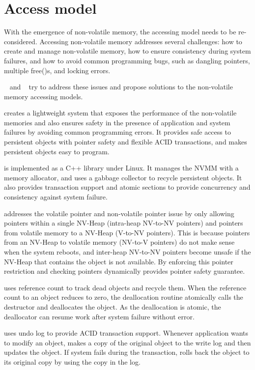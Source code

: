 \section{Access model} 
\label{sec:access}

With the emergence of non-volatile memory, the accessing model needs
to be re-considered. Accessing non-volatile memory addresses several
challenges: how to create and manage non-volatile memory, how to ensure
consistency during system failures, and how to avoid common programming
bugs, such as dangling pointers, multiple free()s, and locking errors.

\nvh{}~\cite{nvheaps} and \mnem{}~\cite{mnemosyne} try to address these issues
and propose solutions to the non-volatile memory accessing models.

\nvh{} creates a lightweight system that exposes the performance of the
non-volatile memories and also ensures safety in the presence of
application and system failures by avoiding common programming errors.
It provides safe access to persistent objects with pointer safety and
flexible ACID transactions, and makes persistent objects easy to program.

\nvh{} is implemented as a C++ library under Linux. It manages
the NVMM with a memory allocator, and uses a gabbage collector to recycle
persistent objects. It also provides transaction support and atomic sections 
to provide concurrency and consistency against system failure.

\nvh{} addresses the volatile pointer and non-volatile pointer issue by
only allowing pointers within a single NV-Heap (intra-heap NV-to-NV pointers)
and pointers from volatile memory to a NV-Heap (V-to-NV pointers). This is
because pointers from an NV-Heap to volatile memory (NV-to-V pointers) do
not make sense when the system reboots, and inter-heap NV-to-NV pointers become
unsafe if the NV-Heap that contains the object is not available. By enforcing
this pointer restriction and checking pointers dynamically \nvh{} provides
pointer safety guarantee.

\nvh{} uses reference count to track dead objects and recycle them. When 
the reference count to an object reduces to zero, the deallocation routine 
atomically calls the destructor and deallocates the object. As the deallocation
is atomic, the deallocator can resume work after system failure without error.

\nvh{} uses undo log to provide ACID transaction support. Whenever application
wants to modify an object, \nvh{} makes a copy of the original object to
the write log and then updates the object. If system fails during
the transaction, \nvh{} rolls back the object to its original copy by using
the copy in the log.

